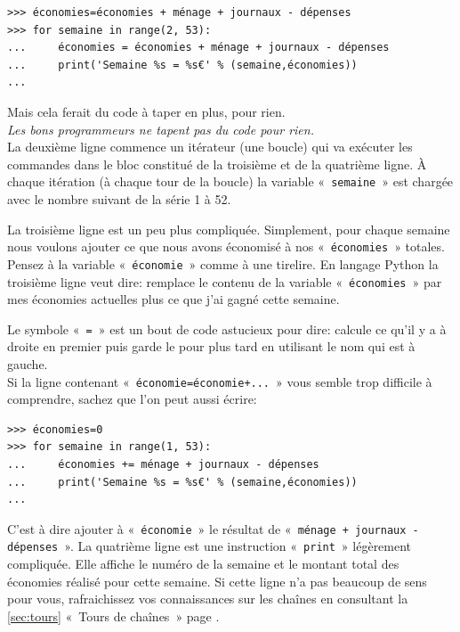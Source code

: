 \begin{Verbatim}[frame=single,rulecolor=\color{gray}, label=moche]
>>> économies=économies + ménage + journaux - dépenses
>>> for semaine in range(2, 53):
...     économies = économies + ménage + journaux - dépenses
...     print('Semaine %s = %s€' % (semaine,économies))
... 
\end{Verbatim}

Mais cela ferait du code à taper en plus, pour rien.\\

\emph{Les bons programmeurs ne tapent pas du code pour rien.}\\



La deuxième ligne commence un itérateur (une boucle) qui va exécuter les commandes dans le bloc constitué de la troisième et de la quatrième ligne. À chaque itération (à chaque tour de la boucle) la variable « \texttt{semaine} » est chargée avec le nombre suivant de la série 1 à 52.

La troisième ligne est un peu plus compliquée. Simplement, pour chaque semaine nous voulons ajouter ce que nous avons économisé à nos « \texttt{économies} » totales. Pensez à la variable « \texttt{économie} » comme à une tirelire. En langage Python la troisième ligne veut dire: remplace le contenu de la variable « \texttt{économies} » par mes économies actuelles plus ce que j'ai gagné cette semaine.

Le symbole « \texttt{=} » est un bout de code astucieux pour dire: calcule ce qu'il y a à droite en premier puis garde le pour plus tard en utilisant le nom qui est à gauche.\\

Si la ligne contenant « \texttt{économie=économie+...} » vous semble trop difficile à comprendre, sachez que l'on peut aussi écrire:

\begin{Verbatim}[frame=single,rulecolor=\color{mbleu}, label=à taper]
>>> économies=0
>>> for semaine in range(1, 53):
...     économies += ménage + journaux - dépenses
...     print('Semaine %s = %s€' % (semaine,économies))
... 
\end{Verbatim}

C'est à dire ajouter à « \texttt{économie} » le résultat de « \texttt{ménage + journaux - dépenses} ». La quatrième ligne est une instruction « \texttt{print} » légèrement compliquée. Elle affiche le numéro de la semaine et le montant total des économies réalisé pour cette semaine. Si cette ligne n'a pas beaucoup de sens pour vous, rafraichissez vos connaissances sur les chaînes en consultant la \autoref{sec:tours} « Tours de chaînes »  page \pageref{sec:tours}.

